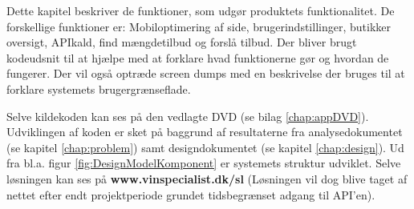 Dette kapitel beskriver de funktioner, som udgør produktets funktionalitet. De forskellige funktioner er: Mobiloptimering af side, brugerindstillinger, butikker oversigt, APIkald, find mængdetilbud og forslå tilbud. Der bliver brugt kodeudsnit til at hjælpe med at forklare hvad funktionerne gør og hvordan de fungerer. Der vil også optræde screen dumps med en beskrivelse der bruges til at forklare systemets brugergrænseflade.

Selve kildekoden kan ses på den vedlagte DVD (se bilag \ref{chap:appDVD}). Udviklingen af koden er sket på baggrund af resultaterne fra analysedokumentet (se kapitel \ref{chap:problem}) samt designdokumentet (se kapitel \ref{chap:design}). Ud fra bl.a. figur \ref{fig:DesignModelKomponent} er systemets struktur udviklet. Selve løsningen kan ses på \textbf{www.vinspecialist.dk/sl} (Løsningen vil dog blive taget af nettet efter endt projektperiode grundet tidsbegrænset adgang til API'en).